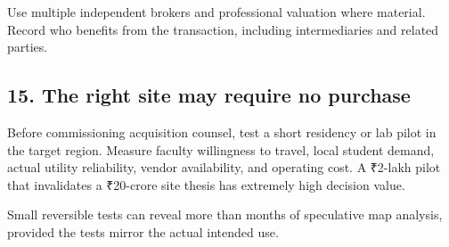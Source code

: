 Use multiple independent brokers and professional valuation where material. Record who benefits from the transaction, including intermediaries and related parties.


\subsection{15. The right site may require no purchase}

Before commissioning acquisition counsel, test a short residency or lab pilot in the target region. Measure faculty willingness to travel, local student demand, actual utility reliability, vendor availability, and operating cost. A \textnormal{₹}2-lakh pilot that invalidates a \textnormal{₹}20-crore site thesis has extremely high decision value.

Small reversible tests can reveal more than months of speculative map analysis, provided the tests mirror the actual intended use.
